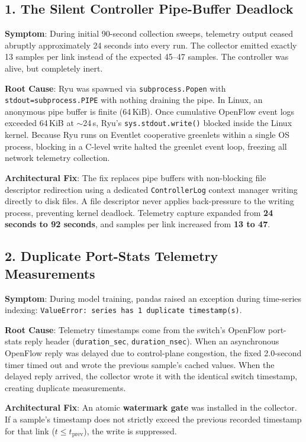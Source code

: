 \subsection{1. The Silent Controller Pipe-Buffer Deadlock}
\textbf{Symptom}: During initial 90-second collection sweeps, telemetry output ceased abruptly approximately 24 seconds into every run. The collector emitted exactly 13 samples per link instead of the expected 45--47 samples. The controller was alive, but completely inert.

\textbf{Root Cause}: Ryu was spawned via \texttt{subprocess.Popen} with \texttt{stdout=subprocess.PIPE} with nothing draining the pipe. In Linux, an anonymous pipe buffer is finite (64\,KiB). Once cumulative OpenFlow event logs exceeded 64\,KiB at $\sim$24\,s, Ryu's \texttt{sys.stdout.write()} blocked inside the Linux kernel. Because Ryu runs on Eventlet cooperative greenlets within a single OS process, blocking in a C-level write halted the greenlet event loop, freezing all network telemetry collection.

\textbf{Architectural Fix}: The fix replaces pipe buffers with non-blocking file descriptor redirection using a dedicated \texttt{ControllerLog} context manager writing directly to disk files. A file descriptor never applies back-pressure to the writing process, preventing kernel deadlock. Telemetry capture expanded from \textbf{24 seconds to 92 seconds}, and samples per link increased from \textbf{13 to 47}.

\subsection{2. Duplicate Port-Stats Telemetry Measurements}
\textbf{Symptom}: During model training, pandas raised an exception during time-series indexing: \texttt{ValueError: series has 1 duplicate timestamp(s)}.

\textbf{Root Cause}: Telemetry timestamps come from the switch's OpenFlow port-stats reply header (\texttt{duration\_sec}, \texttt{duration\_nsec}). When an asynchronous OpenFlow reply was delayed due to control-plane congestion, the fixed 2.0-second timer timed out and wrote the previous sample's cached values. When the delayed reply arrived, the collector wrote it with the identical switch timestamp, creating duplicate measurements.

\textbf{Architectural Fix}: An atomic \textbf{watermark gate} was installed in the collector. If a sample's timestamp does not strictly exceed the previous recorded timestamp for that link ($t \le t_{\text{prev}}$), the write is suppressed.

